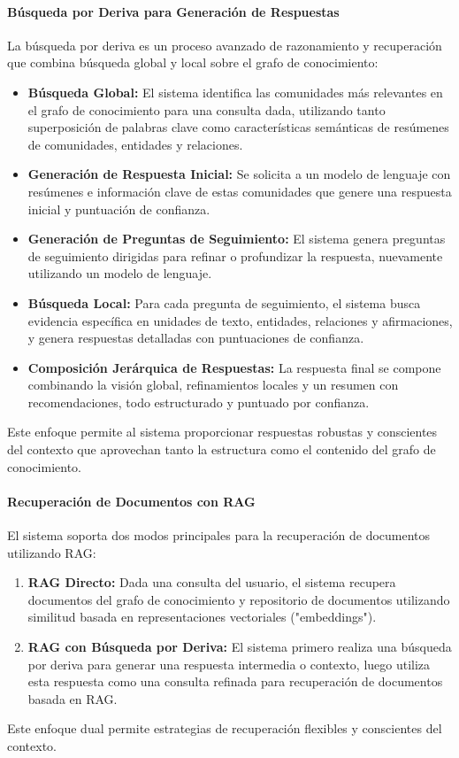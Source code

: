 \documentclass[12pt]{article}
\begin{document}
\paragraph{Búsqueda por Deriva para Generación de Respuestas}
La búsqueda por deriva es un proceso avanzado de razonamiento y recuperación que combina búsqueda global y local sobre el grafo de conocimiento:
\begin{itemize}
    \item \textbf{Búsqueda Global:} El sistema identifica las comunidades más relevantes en el grafo de conocimiento para una consulta dada, utilizando tanto superposición de palabras clave como características semánticas de resúmenes de comunidades, entidades y relaciones.
    \item \textbf{Generación de Respuesta Inicial:} Se solicita a un modelo de lenguaje con resúmenes e información clave de estas comunidades que genere una respuesta inicial y puntuación de confianza.
    \item \textbf{Generación de Preguntas de Seguimiento:} El sistema genera preguntas de seguimiento dirigidas para refinar o profundizar la respuesta, nuevamente utilizando un modelo de lenguaje.
    \item \textbf{Búsqueda Local:} Para cada pregunta de seguimiento, el sistema busca evidencia específica en unidades de texto, entidades, relaciones y afirmaciones, y genera respuestas detalladas con puntuaciones de confianza.
    \item \textbf{Composición Jerárquica de Respuestas:} La respuesta final se compone combinando la visión global, refinamientos locales y un resumen con recomendaciones, todo estructurado y puntuado por confianza.
\end{itemize}
Este enfoque permite al sistema proporcionar respuestas robustas y conscientes del contexto que aprovechan tanto la estructura como el contenido del grafo de conocimiento.

\paragraph{Recuperación de Documentos con RAG}
El sistema soporta dos modos principales para la recuperación de documentos utilizando RAG:
\begin{enumerate}
    \item \textbf{RAG Directo:} Dada una consulta del usuario, el sistema recupera documentos del grafo de conocimiento y repositorio de documentos utilizando similitud basada en representaciones vectoriales ("embeddings").
    \item \textbf{RAG con Búsqueda por Deriva:} El sistema primero realiza una búsqueda por deriva para generar una respuesta intermedia o contexto, luego utiliza esta respuesta como una consulta refinada para recuperación de documentos basada en RAG.
\end{enumerate}
Este enfoque dual permite estrategias de recuperación flexibles y conscientes del contexto.
\end{document}
